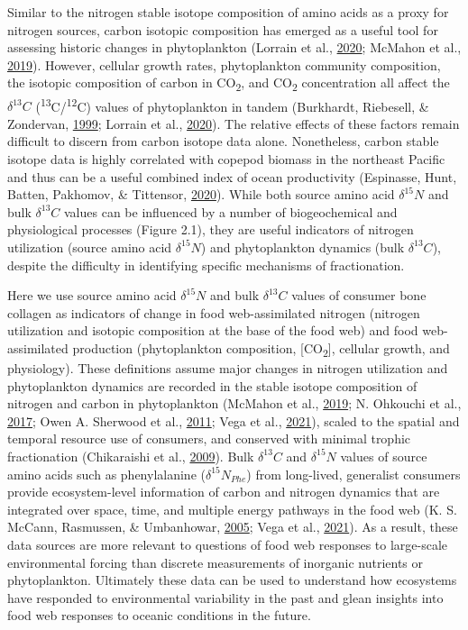 \documentclass [11pt, proquest] {uwthesis}[2015/03/03]
\begin{document}
Similar to the nitrogen stable isotope composition of amino acids as a
proxy for nitrogen sources, carbon isotopic composition has emerged as a
useful tool for assessing historic changes in phytoplankton (Lorrain et
al., \protect\hyperlink{ref-Lorrain2020}{2020}; McMahon et al.,
\protect\hyperlink{ref-McMahon2019}{2019}). However, cellular growth
rates, phytoplankton community composition, the isotopic composition of
carbon in CO\textsubscript{2}, and CO\textsubscript{2} concentration all
affect the \(\delta^{13}C\)
(\textsuperscript{13}C/\textsuperscript{12}C) values of phytoplankton in
tandem (Burkhardt, Riebesell, \& Zondervan,
\protect\hyperlink{ref-Burkhardt1999}{1999}; Lorrain et al.,
\protect\hyperlink{ref-Lorrain2020}{2020}). The relative effects of
these factors remain difficult to discern from carbon isotope data
alone. Nonetheless, carbon stable isotope data is highly correlated with
copepod biomass in the northeast Pacific and thus can be a useful
combined index of ocean productivity (Espinasse, Hunt, Batten, Pakhomov,
\& Tittensor, \protect\hyperlink{ref-Espinasse2020}{2020}). While both
source amino acid \(\delta^{15}N\) and bulk \(\delta^{13}C\) values can
be influenced by a number of biogeochemical and physiological processes
(Figure 2.1), they are useful indicators of nitrogen utilization (source
amino acid \(\delta^{15}N\)) and phytoplankton dynamics (bulk
\(\delta^{13}C\)), despite the difficulty in identifying specific
mechanisms of fractionation.

Here we use source amino acid \(\delta^{15}N\) and bulk \(\delta^{13}C\)
values of consumer bone collagen as indicators of change in food
web-assimilated nitrogen (nitrogen utilization and isotopic composition
at the base of the food web) and food web-assimilated production
(phytoplankton composition, {[}CO\textsubscript{2}{]}, cellular growth,
and physiology). These definitions assume major changes in nitrogen
utilization and phytoplankton dynamics are recorded in the stable
isotope composition of nitrogen and carbon in phytoplankton (McMahon et
al., \protect\hyperlink{ref-McMahon2019}{2019}; N. Ohkouchi et al.,
\protect\hyperlink{ref-Ohkouchi2017}{2017}; Owen A. Sherwood et al.,
\protect\hyperlink{ref-Sherwood2011}{2011}; Vega et al.,
\protect\hyperlink{ref-delaVega2021}{2021}), scaled to the spatial and
temporal resource use of consumers, and conserved with minimal trophic
fractionation (Chikaraishi et al.,
\protect\hyperlink{ref-Chikaraishi2009}{2009}). Bulk \(\delta^{13}C\)
and \(\delta^{15}N\) values of source amino acids such as phenylalanine
(\(\delta^{15}N_{Phe}\)) from long-lived, generalist consumers provide
ecosystem-level information of carbon and nitrogen dynamics that are
integrated over space, time, and multiple energy pathways in the food
web (K. S. McCann, Rasmussen, \& Umbanhowar,
\protect\hyperlink{ref-McCann2005}{2005}; Vega et al.,
\protect\hyperlink{ref-delaVega2021}{2021}). As a result, these data
sources are more relevant to questions of food web responses to
large-scale environmental forcing than discrete measurements of
inorganic nutrients or phytoplankton. Ultimately these data can be used
to understand how ecosystems have responded to environmental variability
in the past and glean insights into food web responses to oceanic
conditions in the future.
\end{document}
